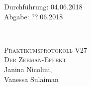 



\begin{titlepage}
  \begin{flushleft}
 Durchführung: 04.06.2018\\
 Abgabe: ??.06.2018
  \end{flushleft}


\HRule\\[1,0cm]

 \begin{center}


\textsc{\LARGE Praktikumsprotokoll V27}\\[1.5cm]
\textsc{\huge Der Zeeman-Effekt} \\[5,5cm]

Janina Nicolini\footnotemark[1], \\
Vanessa Sulaiman\footnotemark[2] \\[1,0cm]



 \end{center}
\HRule

 \vfill

\end{titlepage}

% 




\printbibliography


